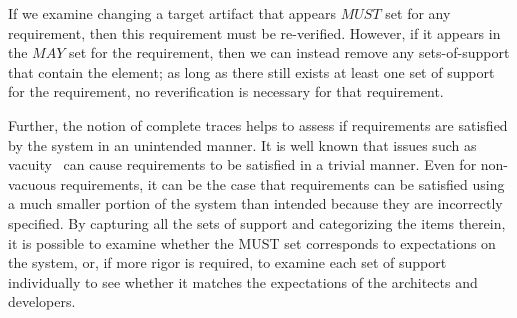 If we examine changing a target artifact that appears $MUST$ set for any requirement, then this requirement must be re-verified. However, if it appears in the $MAY$ set for the requirement, then we can instead remove any sets-of-support that contain the element; as long as there still exists at least one set of support for the requirement, no reverification is necessary for that requirement.

Further, the notion of complete traces helps to assess if requirements are satisfied by the system in an unintended manner. It is well known that issues such as vacuity~\cite{kupferman2003vacuity} can cause requirements to be satisfied in a trivial manner. Even for non-vacuous requirements, it can be the case that requirements can be satisfied using a much smaller portion of the system than intended because they are incorrectly specified.  By capturing all the sets of support and categorizing the items therein, it is possible to examine whether the MUST set corresponds to expectations on the system, or, if more rigor is required, to examine each set of support individually to see whether it matches the expectations of the architects and developers. 